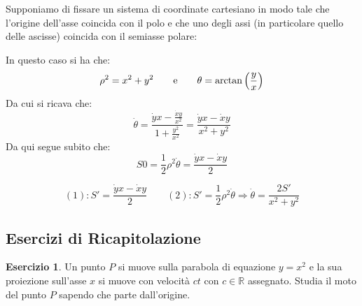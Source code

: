 \documentclass[11pt,a4paper,twoside]{article}
\theoremstyle{definition}
\newtheorem{ese}{Esercizio}[section]
\begin{document}
Supponiamo di fissare un sistema di coordinate cartesiano in modo tale che l'origine dell'asse coincida con il polo e che uno degli assi (in particolare quello delle ascisse) coincida con il semiasse polare:
\begin{center}
\end{center}
In questo caso si ha che:
\[ \rho^2 = x^2 + y^2\qquad \text e \qquad \theta = \arctan\left(\frac yx\right) \]
Da cui si ricava che:
\[\dot \theta = \frac{\dot yx - \frac{\dot xy}{x^2}}{1 + \frac{y^2}{x^2}} = \frac{\dot yx - \dot xy}{x^2 + y^2}\]
Da qui segue subito che:
\[ S0 = \frac 12 \rho^2 \dot \theta = \frac{\dot yx - \dot xy}{2} \]

\begin{prop}{}{}
	\[(1): S' = \frac{\dot yx - \dot xy}{2} \qquad (2): S' = \frac 12 \rho^2 \dot \theta \Rightarrow \dot \theta = \frac{2S'}{x^2 + y^2}\]
\end{prop}

\subsection{Esercizi di Ricapitolazione}

\begin{ese}
	Un punto $P$ si muove sulla parabola di equazione $y = x^2$ e la sua proiezione sull'asse $x$ si muove con velocità $ct$ con $c \in \mathbb R$ assegnato. Studia il moto del punto $P$ sapendo che parte dall'origine.
\end{ese}
\end{document}
